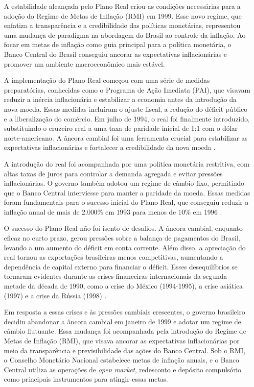 \documentclass[12pt,oneside,a4paper,chapter=TITLE,english,brazil,sumario=abnt-6027-2012]{abntex2}
\begin{document}
A estabilidade alcançada pelo Plano Real criou as condições necessárias para a adoção do Regime de Metas de Inflação (RMI) em 1999. Esse novo regime, que enfatiza a transparência e a credibilidade das políticas monetárias, representou uma mudança de paradigma na abordagem do Brasil ao controle da inflação. Ao focar em metas de inflação como guia principal para a política monetária, o Banco Central do Brasil conseguiu ancorar as expectativas inflacionárias e promover um ambiente macroeconômico mais estável.

A implementação do Plano Real começou com uma série de medidas preparatórias, conhecidas como o Programa de Ação Imediata (PAI), que visavam reduzir a inércia inflacionária e estabilizar a economia antes da introdução da nova moeda. Essas medidas incluíram o ajuste fiscal, a redução do déficit público e a liberalização do comércio. Em julho de 1994, o real foi finalmente introduzido, substituindo o cruzeiro real a uma taxa de paridade inicial de 1:1 com o dólar norte-americano. A âncora cambial foi uma ferramenta crucial para estabilizar as expectativas inflacionárias e fortalecer a credibilidade da nova moeda \cite{silva_2002_plano}. 

A introdução do real foi acompanhada por uma política monetária restritiva, com altas taxas de juros para controlar a demanda agregada e evitar pressões inflacionárias. O governo também adotou um regime de câmbio fixo, permitindo que o Banco Central interviesse para manter a paridade da moeda. Essas medidas foram fundamentais para o sucesso inicial do Plano Real, que conseguiu reduzir a inflação anual de mais de 2.000\% em 1993 para menos de 10\% em 1996 \cite{fabiogiambiagi_1999_a}.

O sucesso do Plano Real não foi isento de desafios. A âncora cambial, enquanto eficaz no curto prazo, gerou pressões sobre a balança de pagamentos do Brasil, levando a um aumento do déficit em conta corrente. Além disso, a apreciação do real tornou as exportações brasileiras menos competitivas, aumentando a dependência de capital externo para financiar o déficit. Esses desequilíbrios se tornaram evidentes durante as crises financeiras internacionais da segunda metade da década de 1990, como a crise do México (1994-1995), a crise asiática (1997) e a crise da Rússia (1998) \cite{santna_2002_crises}.

Em resposta a essas crises e às pressões cambiais crescentes, o governo brasileiro decidiu abandonar a âncora cambial em janeiro de 1999 e adotar um regime de câmbio flutuante. Essa mudança foi acompanhada pela introdução do Regime de Metas de Inflação (RMI), que visava ancorar as expectativas inflacionárias por meio da transparência e previsibilidade das ações do Banco Central. Sob o RMI, o Conselho Monetário Nacional estabelece metas de inflação anuais, e o Banco Central utiliza as operações de \textit{open market}, redesconto e depósito compulsório como  principais instrumentos para atingir essas metas.
\end{document}
